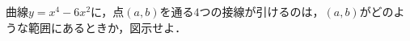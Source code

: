 \documentclass[../../main.tex]{subfiles}
\begin{document}
曲線$y=x^4-6x^2$に，点$(a,b)$を通る$4$つの接線が引けるのは，$(a,b)$がどのような範囲にあるときか，図示せよ．
\end{document}
